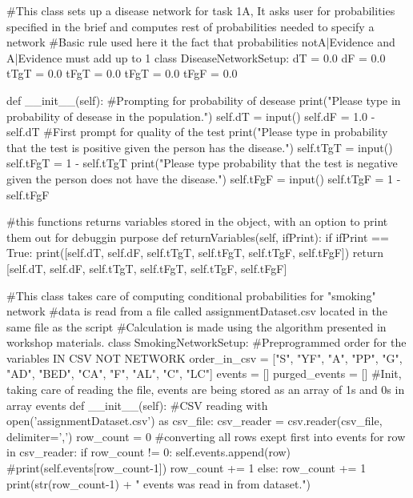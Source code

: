 \documentclass[10pt]{article}
\begin{document}
\begin{spverbatim}
#This class sets up a disease network for task 1A, It asks user for probabilities specified in the brief and computes rest of probabilities needed to specify a network
#Basic rule used here it the fact that probabilities notA|Evidence and A|Evidence must add up to 1
class DiseaseNetworkSetup:
    dT = 0.0
    dF = 0.0
    tTgT = 0.0
    tFgT = 0.0
    tFgT = 0.0
    tFgF = 0.0
    
    def __init__(self):
        #Prompting for probability of desease
        print("Please type in probability of desease in the population.")
        self.dT = input()
        self.dF = 1.0 - self.dT
        #First prompt for quality of the test
        print("Please type in probability that the test is positive given the person has the disease.")
        self.tTgT = input()
        self.tFgT = 1 - self.tTgT
        print("Please type probability that the test is negative given the person does not have the disease.")
        self.tFgF = input()
        self.tTgF = 1 - self.tFgF
    
    #this functions returns variables stored in the object, with an option to print them out for debuggin purpose
    def returnVariables(self,  ifPrint):
        if ifPrint == True:
            print([self.dT,  self.dF,  self.tTgT, self.tFgT, self.tTgF, self.tFgF])
        return [self.dT,  self.dF,  self.tTgT, self.tFgT, self.tTgF, self.tFgF]


#This class takes care of computing conditional probabilities for "smoking" network
#data is read from a file called assignmentDataset.csv located in the same file as the script
#Calculation is made using the algorithm presented in workshop materials.
class SmokingNetworkSetup:
    #Preprogrammed order for the variables IN CSV NOT NETWORK
    order_in_csv = ["S",  "YF",  "A",  "PP",  "G",  "AD",  "BED",  "CA",  "F",  "AL",  "C", "LC"]
    events = []
    purged_events = []
    #Init, taking care of reading the file, events are being stored as an array of 1s and 0s in array events
    def __init__(self):
        #CSV reading
        with open('assignmentDataset.csv') as csv_file:
            csv_reader = csv.reader(csv_file, delimiter=',')
            row_count = 0
            #converting all rows exept first into events
            for row in csv_reader:
                if row_count != 0:
                    self.events.append(row)
                    #print(self.events[row_count-1])
                    row_count += 1
                else:
                    row_count += 1
        print(str(row_count-1) + " events was read in from dataset.")


\end{spverbatim}
\end{document}
